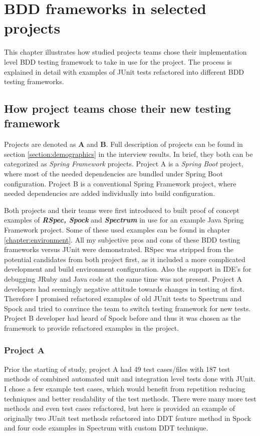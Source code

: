 \chapter{BDD frameworks in selected projects}
\label{chapter:projects}

This chapter illustrates how studied projects teams chose their implementation level BDD testing
framework to take in use for the project. The process is explained in detail with examples of JUnit tests
refactored into different BDD testing frameworks.

\section{How project teams chose their new testing framework}
\label{section:teams}
    Projects are denoted as \textbf{A} and \textbf{B}. Full description of projects can be found in section \ref{section:demographics} in the interview
    results. In brief, they both can be categorized as \textit{Spring Framework} projects. Project A is a \textit{Spring Boot} project, where
    most of the needed dependencies are bundled under Spring Boot configuration. Project B is a conventional Spring Framework project,
    where needed dependencies are added individually into build configuration.

    Both projects and their teams were first introduced to built proof of concept examples of \textbf{\textit{RSpec, Spock}} and \textbf{\textit{Spectrum}}
    in use for an example Java Spring Framework project. Some of these used examples can be found in chapter \ref{chapter:environment}.
    All my subjective pros and cons of these BDD testing frameworks versus JUnit were demonstrated. RSpec was stripped from the
    potential candidates from both project first, as it included a more complicated development and build environment configuration. Also
    the support in IDE's for debugging JRuby and Java code at the same time was not present. Project A developers had
    seemingly negative attitude towards changes in testing at first. Therefore I promised refactored examples of old JUnit
    tests to Spectrum and Spock and tried to convince the team to switch testing framework for new tests.
    Project B developer had heard of Spock before and thus it was chosen as the framework to provide refactored examples in the project.

    \subsection{Project A}
    Prior the starting of study, project A had 49 test cases/files with 187 test methods of combined automated unit and integration level tests done with JUnit.
    I chose a few example test cases, which would benefit from repetition reducing techniques and better readability of the test methods.
    There were many more test methods and even test cases refactored, but here is provided an example of originally two JUnit
    test methods refactored into DDT feature method in Spock and four code examples in Spectrum with custom DDT technique.

